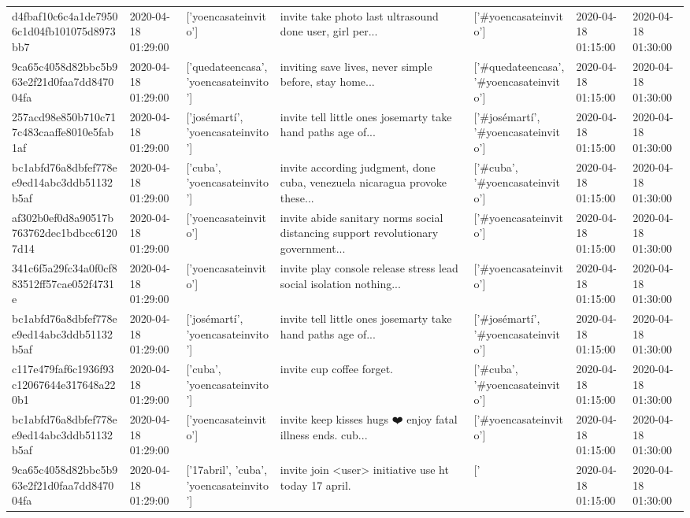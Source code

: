 \begin{tabular}{lllllll}
d4fbaf10c6c4a1de79506c1d04fb101075d8973bb7 & 2020-04-18 01:29:00 & ['yoencasateinvito'] & invite take photo last ultrasound done user, girl per... & ['#yoencasateinvito'] & 2020-04-18 01:15:00 & 2020-04-18 01:30:00 \\
9ca65c4058d82bbc5b963e2f21d0faa7dd847004fa & 2020-04-18 01:29:00 & ['quedateencasa', 'yoencasateinvito'] & inviting save lives, never simple before, stay home... & ['#quedateencasa', '#yoencasateinvito'] & 2020-04-18 01:15:00 & 2020-04-18 01:30:00 \\
257acd98e850b710c717c483caaffe8010e5fab1af & 2020-04-18 01:29:00 & ['josémartí', 'yoencasateinvito'] & invite tell little ones josemarty take hand paths age of... & ['#josémartí', '#yoencasateinvito'] & 2020-04-18 01:15:00 & 2020-04-18 01:30:00 \\
bc1abfd76a8dbfef778ee9ed14abc3ddb51132b5af & 2020-04-18 01:29:00 & ['cuba', 'yoencasateinvito'] & invite according judgment, done cuba, venezuela nicaragua provoke these... & ['#cuba', '#yoencasateinvito'] & 2020-04-18 01:15:00 & 2020-04-18 01:30:00 \\
af302b0ef0d8a90517b763762dec1bdbcc61207d14 & 2020-04-18 01:29:00 & ['yoencasateinvito'] & invite abide sanitary norms social distancing support revolutionary government... & ['#yoencasateinvito'] & 2020-04-18 01:15:00 & 2020-04-18 01:30:00 \\
341c6f5a29fc34a0f0cf883512ff57cae052f4731e & 2020-04-18 01:29:00 & ['yoencasateinvito'] & invite play console release stress lead social isolation nothing... & ['#yoencasateinvito'] & 2020-04-18 01:15:00 & 2020-04-18 01:30:00 \\
bc1abfd76a8dbfef778ee9ed14abc3ddb51132b5af & 2020-04-18 01:29:00 & ['josémartí', 'yoencasateinvito'] & invite tell little ones josemarty take hand paths age of... & ['#josémartí', '#yoencasateinvito'] & 2020-04-18 01:15:00 & 2020-04-18 01:30:00 \\
c117e479faf6c1936f93c12067644e317648a220b1 & 2020-04-18 01:29:00 & ['cuba', 'yoencasateinvito'] & invite cup coffee forget. & ['#cuba', '#yoencasateinvito'] & 2020-04-18 01:15:00 & 2020-04-18 01:30:00 \\
bc1abfd76a8dbfef778ee9ed14abc3ddb51132b5af & 2020-04-18 01:29:00 & ['yoencasateinvito'] & invite keep kisses hugs ❤️ enjoy fatal illness ends. cub... & ['#yoencasateinvito'] & 2020-04-18 01:15:00 & 2020-04-18 01:30:00 \\
9ca65c4058d82bbc5b963e2f21d0faa7dd847004fa & 2020-04-18 01:29:00 & ['17abril', 'cuba', 'yoencasateinvito'] & invite join <user> initiative use ht today 17 april. & ['#17abril', '#cuba', '#yoencasateinvito'] & 2020-04-18 01:15:00 & 2020-04-18 01:30:00 \\

\end{tabular}
